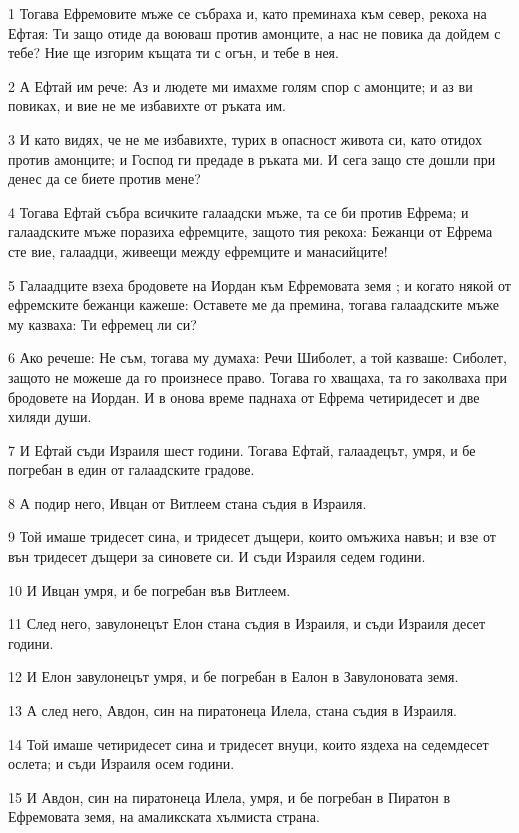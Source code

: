 \par 1 Тогава Ефремовите мъже се събраха и, като преминаха към север, рекоха на Ефтая: Ти защо отиде да воюваш против амонците, а нас не повика да дойдем с тебе? Ние ще изгорим къщата ти с огън, и тебе в нея.
\par 2 А Ефтай им рече: Аз и людете ми имахме голям спор с амонците; и аз ви повиках, и вие не ме избавихте от ръката им.
\par 3 И като видях, че не ме избавихте, турих в опасност живота си, като отидох против амонците; и Господ ги предаде в ръката ми. И сега защо сте дошли при денес да се биете против мене?
\par 4 Тогава Ефтай събра всичките галаадски мъже, та се би против Ефрема; и галаадските мъже поразиха ефремците, защото тия рекоха: Бежанци от Ефрема сте вие, галаадци, живеещи между ефремците и манасийците!
\par 5 Галаадците взеха бродовете на Иордан към Ефремовата земя ; и когато някой от ефремските бежанци кажеше: Оставете ме да премина, тогава галаадските мъже му казваха: Ти ефремец ли си?
\par 6 Ако речеше: Не съм, тогава му думаха: Речи Шиболет, а той казваше: Сиболет, защото не можеше да го произнесе право. Тогава го хващаха, та го заколваха при бродовете на Иордан. И в онова време паднаха от Ефрема четиридесет и две хиляди души.
\par 7 И Ефтай съди Израиля шест години. Тогава Ефтай, галаадецът, умря, и бе погребан в един от галаадските градове.
\par 8 А подир него, Ивцан от Витлеем стана съдия в Израиля.
\par 9 Той имаше тридесет сина, и тридесет дъщери, които омъжиха навън; и взе от вън тридесет дъщери за синовете си. И съди Израиля седем години.
\par 10 И Ивцан умря, и бе погребан във Витлеем.
\par 11 След него, завулонецът Елон стана съдия в Израиля, и съди Израиля десет години.
\par 12 И Елон завулонецът умря, и бе погребан в Еалон в Завулоновата земя.
\par 13 А след него, Авдон, син на пиратонеца Илела, стана съдия в Израиля.
\par 14 Той имаше четиридесет сина и тридесет внуци, които яздеха на седемдесет ослета; и съди Израиля осем години.
\par 15 И Авдон, син на пиратонеца Илела, умря, и бе погребан в Пиратон в Ефремовата земя, на амаликската хълмиста страна.

